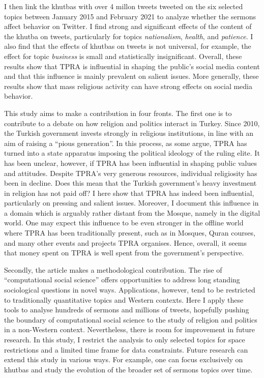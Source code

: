 \documentclass[
  12pt,
]{article}
\begin{document}
I then link the khutbas with over 4 millon tweets tweeted on the six selected topics between January 2015 and February 2021 to analyze whether the sermons affect behavior on Twitter. I find strong and significant effects of the content of the khutba on tweets, particularly for topics \emph{nationalism}, \emph{health}, and \emph{patience}. I also find that the effects of khutbas on tweets is not universal, for example, the effect for topic \emph{business} is small and statistically insignificant. Overall, these results show that TPRA is influential in shaping the public's social media content and that this influence is mainly prevalent on salient issues. More generally, these results show that mass religious activity can have strong effects on social media behavior.

This study aims to make a contribution in four fronts. The first one is to contribute to a debate on how religion and politics interact in Turkey. Since 2010, the Turkish government invests strongly in religious institutions, in line with an aim of raising a ``pious generation''. In this process, as some argue, TPRA has turned into a state apparatus imposing the political ideology of the ruling elite. It has been unclear, however, if TPRA has been influential in shaping public values and attitudes. Despite TPRA's very generous resources, individual religiosity has been in decline. Does this mean that the Turkish government's heavy investment in religion has not paid off? I here show that TPRA has indeed been influential, particularly on pressing and salient issues. Moreover, I document this influence in a domain which is arguably rather distant from the Mosque, namely in the digital world. One may expect this influence to be even stronger in the offline world where TPRA has been traditionally present, such as in Mosques, Quran courses, and many other events and projects TPRA organises. Hence, overall, it seems that money spent on TPRA is well spent from the government's perspective.

Secondly, the article makes a methodological contribution. The rise of ``computational social science'' offers opportunities to address long standing sociological questions in novel ways. Applications, however, tend to be restricted to traditionally quantitative topics and Western contexts. Here I apply these tools to analyse hundreds of sermons and millions of tweets, hopefully pushing the boundary of computational social science to the study of religion and politics in a non-Western context. Nevertheless, there is room for improvement in future research. In this study, I restrict the analysis to only selected topics for space restrictions and a limited time frame for data constraints. Future research can extend this study in various ways. For example, one can focus exclusively on khutbas and study the evolution of the broader set of sermons topics over time.
\end{document}
